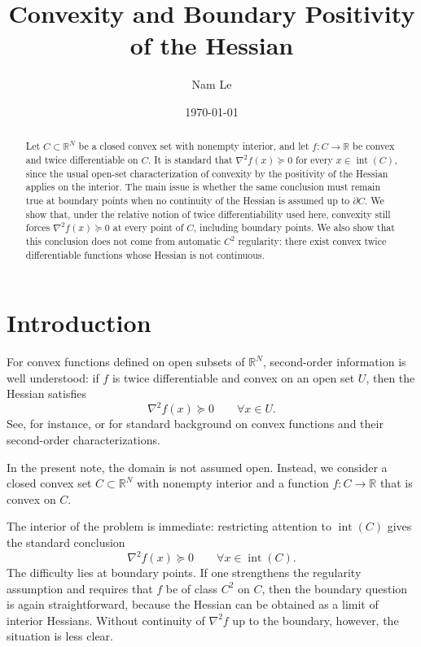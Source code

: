 \documentclass[reqno]{amsart}
\title{Convexity and Boundary Positivity of the Hessian}
\author{Nam Le}
\date{\today}
\theoremstyle{definition}
\newcommand{\R}{\mathbb{R}}
\begin{document}
\begin{abstract}
Let $C \subset \R^N$ be a closed convex set with nonempty interior, and let
$f \colon C \to \R$ be convex and twice differentiable on $C$. It is standard
that $\nabla^2 f(x) \succeq 0$ for every $x \in \operatorname{int}(C)$, since the
usual open-set characterization of convexity by the positivity of the Hessian
applies on the interior. The main issue is whether the same conclusion must
remain true at boundary points when no continuity of the Hessian is assumed up
to $\partial C$. We show that, under the relative notion of twice
differentiability used here, convexity still forces
$\nabla^2 f(x) \succeq 0$ at every point of $C$, including boundary points. We
also show that this conclusion does not come from automatic $C^2$ regularity:
there exist convex twice differentiable functions whose Hessian is not
continuous.
\end{abstract}

\maketitle

\section{Introduction}\label{sec:introduction}

For convex functions defined on open subsets of $\R^N$, second-order
information is well understood: if $f$ is twice differentiable and convex on an
open set $U$, then the Hessian satisfies
\begin{equation}
    \nabla^2 f(x) \succeq 0 \qquad \forall x \in U.
\end{equation}
See, for instance, \citet{Rockafellar1970} or
\citet{HiriartLemarechal2001} for standard background on convex functions and
their second-order characterizations.

In the present note, the domain is not assumed open. Instead, we consider a
closed convex set $C \subset \R^N$ with nonempty interior and a function
$f \colon C \to \R$ that is convex on $C$.

The interior of the problem is immediate: restricting attention to
$\operatorname{int}(C)$ gives the standard conclusion
\begin{equation}
    \nabla^2 f(x) \succeq 0 \qquad \forall x \in \operatorname{int}(C).
\end{equation}
The difficulty lies at boundary points. If one strengthens the regularity
assumption and requires that $f$ be of class $C^2$ on $C$, then the boundary
question is again straightforward, because the Hessian can be obtained as a
limit of interior Hessians. Without continuity of $\nabla^2 f$ up to the
boundary, however, the situation is less clear.
\end{document}
